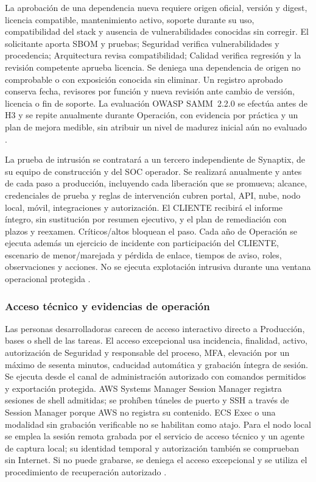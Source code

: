 La aprobación de una dependencia nueva requiere origen oficial, versión y digest, licencia compatible, mantenimiento activo, soporte durante su uso, compatibilidad del stack y ausencia de vulnerabilidades conocidas sin corregir. El solicitante aporta SBOM y pruebas; Seguridad verifica vulnerabilidades y procedencia; Arquitectura revisa compatibilidad; Calidad verifica regresión y la revisión competente aprueba licencia. Se deniega una dependencia de origen no comprobable o con exposición conocida sin eliminar. Un registro aprobado conserva fecha, revisores por función y nueva revisión ante cambio de versión, licencia o fin de soporte. La evaluación OWASP SAMM~2.2.0 se efectúa antes de H3 y se repite anualmente durante Operación, con evidencia por práctica y un plan de mejora medible, sin atribuir un nivel de madurez inicial aún no evaluado \parencite{sec-samm}.

La prueba de intrusión se contratará a un tercero independiente de Synaptix, de su equipo de construcción y del SOC operador. Se realizará anualmente y antes de cada paso a producción, incluyendo cada liberación que se promueva; alcance, credenciales de prueba y reglas de intervención cubren portal, API, nube, nodo local, móvil, integraciones y autorización. El CLIENTE recibirá el informe íntegro, sin sustitución por resumen ejecutivo, y el plan de remediación con plazos y reexamen. Críticos/altos bloquean el paso. Cada año de Operación se ejecuta además un ejercicio de incidente con participación del CLIENTE, escenario de menor/marejada y pérdida de enlace, tiempos de aviso, roles, observaciones y acciones. No se ejecuta explotación intrusiva durante una ventana operacional protegida \parencite[RT-11.20/21, p.~24]{pucv-transversal}.

\subsubsection{Acceso técnico y evidencias de operación}
\label{sec:4-acceso-alertas-rt}

Las personas desarrolladoras carecen de acceso interactivo directo a Producción, bases o shell de las tareas. El acceso excepcional usa incidencia, finalidad, activo, autorización de Seguridad y responsable del proceso, MFA, elevación por un máximo de sesenta minutos, caducidad automática y grabación íntegra de sesión. Se ejecuta desde el canal de administración autorizado con comandos permitidos y exportación protegida. AWS Systems Manager Session Manager registra sesiones de shell admitidas; se prohíben túneles de puerto y SSH a través de Session Manager porque AWS no registra su contenido. ECS Exec o una modalidad sin grabación verificable no se habilitan como atajo. Para el nodo local se emplea la sesión remota grabada por el servicio de acceso técnico y un agente de captura local; su identidad temporal y autorización también se comprueban sin Internet. Si no puede grabarse, se deniega el acceso excepcional y se utiliza el procedimiento de recuperación autorizado \parencites{sec-ssm-grabacion}[RT-11.27, p.~24]{pucv-transversal}.

